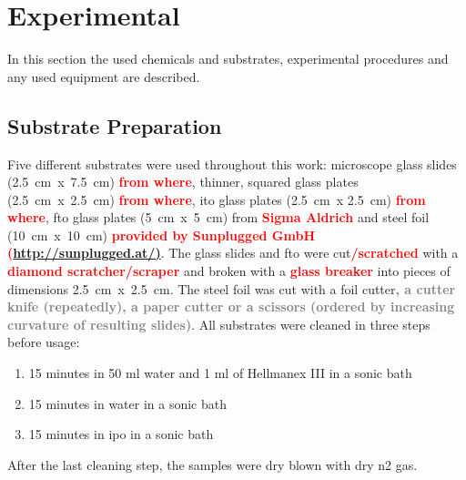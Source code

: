 \documentclass[a4paper]{article}
\newcommand{\td}[1]{\textbf{\textcolor{red}{#1}}}
\newcommand{\me}[1]{\textbf{\textcolor{gray}{#1}}}
\begin{document}
\section{Experimental}
\label{sec:exp}
In this section the used chemicals and substrates, experimental procedures and any used equipment are described. 
\subsection{Substrate Preparation}
Five different substrates were used throughout this work: 
microscope glass slides (2.5~cm~x~7.5~cm) \td{from where}, thinner, squared glass plates (2.5~cm~x~2.5~cm) \td{from where}, \gls{ito} glass plates (2.5~cm~x 2.5~cm) \td{from where}, \gls{fto} glass plates (5~cm~x~5~cm) from \td{Sigma Aldrich} and steel foil (10~cm~x~10~cm) \td{provided by Sunplugged GmbH (\url{http://sunplugged.at/)}}.
The glass slides and \gls{fto} were cut\td{/scratched} with a \td{diamond scratcher/scraper} and broken with a \td{glass breaker} into pieces of dimensions 2.5~cm~x~2.5~cm.
The steel foil was cut with a foil cutter\me{, a cutter knife (repeatedly), a paper cutter or a scissors (ordered by increasing curvature of resulting slides)}.
All substrates were cleaned in three steps before usage:
\begin{enumerate}
	\item 15 minutes in 50 ml \gls{water} and 1 ml of Hellmanex III in a sonic bath
	\item 15 minutes in \gls{water} in a sonic bath
	\item 15 minutes in \gls{ipo} in a sonic bath 
\end{enumerate}
After the last cleaning step, the samples were dry blown with dry \gls{n2} gas. 

\end{document}
